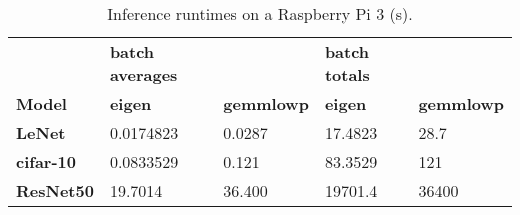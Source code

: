 \begin{table}[]
\centering
\caption[Raspberry Pi inference runtimes]{Inference runtimes on a Raspberry Pi 3 (s).}
\label{tbl:runtimerpi}
\begin{tabular}{lllll}
                  & \textbf{batch averages} &                   & \textbf{batch totals} &                   \\
\textbf{Model}    & \textbf{eigen}         & \textbf{gemmlowp} & \textbf{eigen}        & \textbf{gemmlowp} \\
\textbf{LeNet}    & 0.0174823                  & 0.0287          & 17.4823                & 28.7          \\
\textbf{cifar-10} & 0.0833529                & 0.121          & 83.3529              & 121          \\
\textbf{ResNet50} & 19.7014              & 36.400       & 19701.4            & 36400       
\end{tabular}
\end{table}

